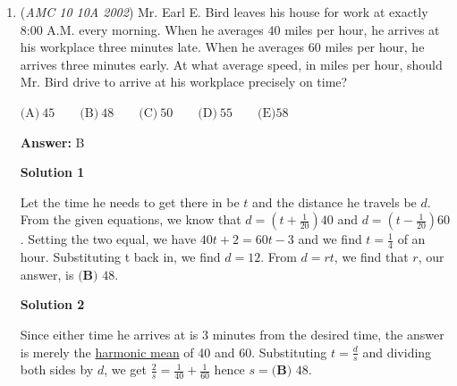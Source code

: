 \begin{enumerate}
 Thus our answer is $3+10 = \boxed{\textbf{(B) }13 }$.

 



\textbf{Solution 2}

Similarly to Solution 1, we see that there must be $3$ disks to account for the $0.8$ MB file. Secondly, since there are $[30-(3+12)]-3 = 12$ files(for both 0.4 MB and 0.7 MB) left, it is easy to see that the optimal way to place the files would be $3$ files per disks for the 0.4 MB files and hence would require 4 disks. 

 We are left with $12$ files($0.7$ MB), where the optimal number of files per disks is $2$, so the optimal number of disks for this type of file would be $6$ disks. Therefore, the answer is $3+4+6=\boxed{13}$.

 


	\item (\textit{AMC 10 10A 2002}) Mr. Earl E. Bird leaves his house for work at exactly 8:00 A.M. every morning. When he averages $40$ miles per hour, he arrives at his workplace three minutes late. When he averages $60$ miles per hour, he arrives three minutes early. At what average speed, in miles per hour, should Mr. Bird drive to arrive at his workplace precisely on time?


 $\text{(A)}\ 45 \qquad \text{(B)}\ 48 \qquad \text{(C)}\ 50 \qquad \text{(D)}\ 55 \qquad \text{(E)} 58$

 \textbf{Answer: }B



\textbf{Solution 1}

Let the time he needs to get there in be $t$ and the distance he travels be $d$. From the given equations, we know that $d=\left(t+\frac{1}{20}\right)40$ and $d=\left(t-\frac{1}{20}\right)60$. Setting the two equal, we have $40t+2=60t-3$ and we find $t=\frac{1}{4}$ of an hour. Substituting t back in, we find $d=12$. From $d=rt$, we find that $r$, our answer, is $\boxed{\textbf{(B) }48 }$.

 



\textbf{Solution 2}

Since either time he arrives at is $3$ minutes from the desired time, the answer is merely the \href{https://artofproblemsolving.com/wiki/index.php?title=Harmonic\_mean}{harmonic mean} of 40 and 60. Substituting $t=\frac ds$ and dividing both sides by $d$, we get $\frac 2s = \frac 1{40} + \frac 1{60}$ hence $s=\boxed{\textbf{(B) }48}$.


\end{enumerate}
